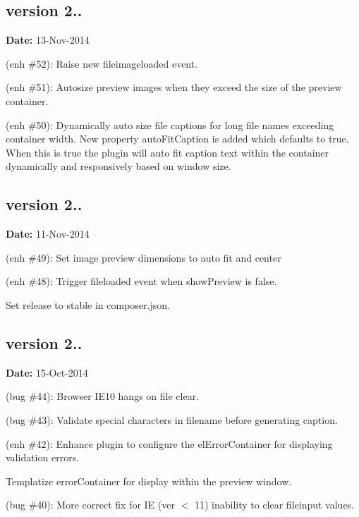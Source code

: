 \subsection*{version 2..}

{\bfseries Date\+:} 13-\/\+Nov-\/2014


\begin{DoxyItemize}
\item (enh \#52)\+: Raise new {\ttfamily fileimageloaded} event.
\item (enh \#51)\+: Autosize preview images when they exceed the size of the preview container.
\item (enh \#50)\+: Dynamically auto size file captions for long file names exceeding container width. New property {\ttfamily auto\+Fit\+Caption} is added which defaults to {\ttfamily true}. When this is {\ttfamily true} the plugin will auto fit caption text within the container dynamically and responsively based on window size.
\end{DoxyItemize}

\subsection*{version 2..}

{\bfseries Date\+:} 11-\/\+Nov-\/2014


\begin{DoxyItemize}
\item (enh \#49)\+: Set image preview dimensions to auto fit and center
\item (enh \#48)\+: Trigger {\ttfamily fileloaded} event when {\ttfamily show\+Preview} is {\ttfamily false}.
\item Set release to stable in composer.\+json.
\end{DoxyItemize}

\subsection*{version 2..}

{\bfseries Date\+:} 15-\/\+Oct-\/2014


\begin{DoxyItemize}
\item (bug \#44)\+: Browser I\+E10 hangs on file clear.
\item (bug \#43)\+: Validate special characters in filename before generating caption.
\item (enh \#42)\+: Enhance plugin to configure the {\ttfamily el\+Error\+Container} for displaying validation errors.
\item Templatize error\+Container for display within the preview window.
\item (bug \#40)\+: More correct fix for IE (ver $<$ 11) inability to clear fileinput values.
\end{DoxyItemize}

